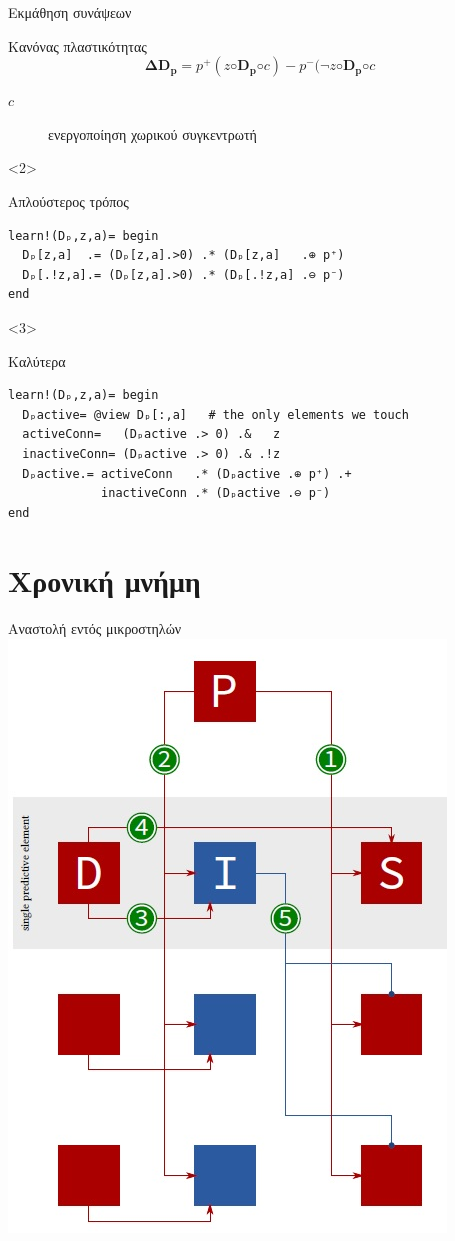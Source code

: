 \documentclass[10pt,lualatex]{beamer}
\begin{document}
\begin{frame}[fragile]{Εκμάθηση συνάψεων}
\begin{block}{Κανόνας πλαστικότητας}
  \[ \mathbf{ΔD_p} = p^+(z◦\mathbf{D_p}◦c) - p^-(\lnot z◦ \mathbf{D_p}◦c\]
  \begin{description}
    \item[$c$] ενεργοποίηση χωρικού συγκεντρωτή
  \end{description}
\end{block}
\begin{onlyenv}<2>
\begin{block}{Απλούστερος τρόπος}
\begin{verbatim}
learn!(Dₚ,z,a)= begin
  Dₚ[z,a]  .= (Dₚ[z,a].>0) .* (Dₚ[z,a]   .⊕ p⁺)
  Dₚ[.!z,a].= (Dₚ[z,a].>0) .* (Dₚ[.!z,a] .⊖ p⁻)
end
\end{verbatim}
\end{block}
\end{onlyenv}
\begin{onlyenv}<3>
\begin{block}{Καλύτερα}
\begin{verbatim}
learn!(Dₚ,z,a)= begin
  Dₚactive= @view Dₚ[:,a]   # the only elements we touch
  activeConn=   (Dₚactive .> 0) .&   z
  inactiveConn= (Dₚactive .> 0) .& .!z
  Dₚactive.= activeConn   .* (Dₚactive .⊕ p⁺) .+
             inactiveConn .* (Dₚactive .⊖ p⁻)
end
\end{verbatim}
\end{block}
\end{onlyenv}
\end{frame}

\section{Χρονική μνήμη}

\begin{frame}{Αναστολή \alert{εντός} μικροστηλών}
  \centering
  \includegraphics[width=.5\textwidth]{../figures/temporal_hardware}
\end{frame}
\end{document}
